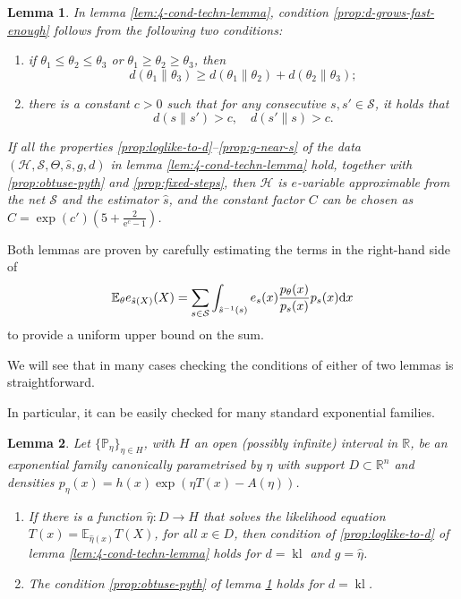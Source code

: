 \documentclass{article}
\newtheorem{lemma}{Lemma}
\theoremstyle{definition}
\theoremstyle{definition}
\newcommand{\reals}{\mathbb{R}}
\newcommand{\probP}{\mathbb{P}}
\newcommand{\expectE}{\mathbb{E}}
\newcommand{\kl}{\operatorname{kl}}
\newcommand{\Eta}{H}
\newcommand{\e}{\mathrm{e}}
\begin{document}
\begin{lemma}\label{lem:5-cond-techn-lemma}
    In lemma \ref{lem:4-cond-techn-lemma}, condition \ref{prop:d-grows-fast-enough} follows from the following two conditions:
    \begin{enumerate}[label=(p \roman*')]
        \item\label{prop:obtuse-pyth} if $\theta_1 \leq \theta_2 \leq \theta_3$ or $\theta_1 \ge \theta_2 \ge \theta_3$, then 
        \[
           d(\theta_1\|\theta_3) \ge d(\theta_1\|\theta_2) + d(\theta_2\|\theta_3);
        \]
        \item\label{prop:fixed-steps} there is a constant $c > 0$ such that for any consecutive $s, s' \in \mathcal{S}$, it holds that
        \[
            d(s\|s') > c,\quad d(s'\|s) > c.
        \]
    \end{enumerate}

    If all the properties \ref{prop:loglike-to-d}--\ref{prop:g-near-s} of the data $(\mathcal{H}, \mathcal{S}, \Theta, \hat{s}, g, d)$ in lemma \ref{lem:4-cond-techn-lemma} hold, together with \ref{prop:obtuse-pyth} and \ref{prop:fixed-steps}, then $\mathcal{H}$ is $e$-variable approximable from the net $\mathcal{S}$ and the estimator $\hat s$, and the constant factor $C$ can be chosen as $C = \exp(c')\left(5 + \frac{2}{\e^c - 1}\right)$.
\end{lemma}

Both lemmas are proven by carefully estimating the terms in the right-hand side of
\[
    \expectE_{\theta} e_{\hat s(X)}(X) = \sum_{s\in\mathcal{S}} \int_{\hat s^{-1}(s)} e_s(x) \frac{p_\theta (x)}{p_s(x)} p_s(x) {\rm d}x
\]
to provide a uniform upper bound on the sum.

We will see that in many cases checking the conditions of either of two lemmas is straightforward.

In particular, it can be easily checked for many standard exponential families.

\begin{lemma}\label{lem:exp-fams-are-good}
    Let $\{ \probP_\eta\}_{\eta\in\Eta}$, with $\Eta$ an open (possibly infinite) interval in $\reals$, be an exponential family canonically parametrised by $\eta$ with support $D \subset\reals^n$ and densities $p_\eta(x) = h(x)\exp\left(\eta T(x) - A(\eta)\right)$.

    \begin{enumerate}
        \item If there is a function $\hat\eta:D\to \Eta$ that solves the likelihood equation $T(x) = \expectE_{\hat\eta(x)}T(X)$, for all $x \in D$, then condition of \ref{prop:loglike-to-d} of lemma \ref{lem:4-cond-techn-lemma} holds for $d = \kl$ and $g=\hat\eta$.
        \item The condition \ref{prop:obtuse-pyth} of lemma \ref{lem:5-cond-techn-lemma} holds for $d = \kl$.
    \end{enumerate}
\end{lemma}
\end{document}
